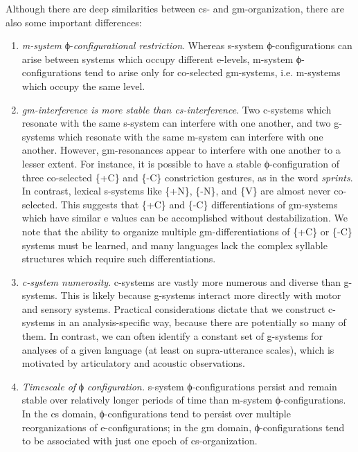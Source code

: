 Although there are deep similarities between cs- and gm-organization, there are also some important differences: 

\begin{enumerate}
\item \textit{m-system} ϕ-\textit{configurational restriction}. Whereas s-system ϕ-configurations can arise between systems which occupy different e-levels, m-system ϕ-configurations tend to arise only for co-selected gm-systems, i.e. m-systems which occupy the same level. 

\item \textit{gm-interference is more stable than cs-interference}. Two c-systems which resonate with the same s-system can interfere with one another, and two g-systems which resonate with the same m-system can interfere with one another. However, gm-resonances appear to interfere with one another to a lesser extent. For instance, it is possible to have a stable ϕ-configuration of three co-selected \{+C\} and \{-C\} constriction gestures, as in the word \textit{sprints}. In contrast, lexical s-systems like \{+N\}, \{-N\}, and \{V\} are almost never co-selected. This suggests that \{+C\} and \{-C\} differentiations of gm-systems which have similar e values can be accomplished without destabilization. We note that the ability to organize multiple gm-differentiations of \{+C\} or \{-C\} systems must be learned, and many languages lack the complex syllable structures which require such differentiations.

\item \textit{c-system numerosity}. c-systems are vastly more numerous and diverse than g-systems. This is likely because g-systems interact more directly with motor and sensory systems. Practical considerations dictate that we construct c-systems in an analysis-specific way, because there are potentially so many of them. In contrast, we can often identify a constant set of g-systems for analyses of a given language (at least on supra-utterance scales), which is motivated  by articulatory and acoustic observations.

\item  \textit{Timescale of} ϕ \textit{configuration.} s-system ϕ-configurations persist and remain stable over relatively longer periods of time than m-system ϕ-configurations. In the cs domain, ϕ-configurations tend to persist over multiple reorganizations of e-configurations; in the gm domain, ϕ-configurations tend to be associated with just one epoch of cs-organization.
\end{enumerate}

